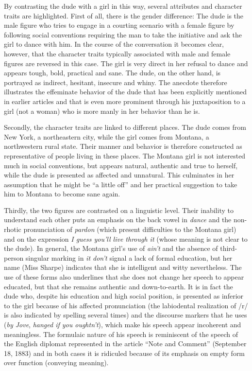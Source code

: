  By contrasting the dude with a girl in this way, several attributes and character traits are highlighted. First of all, there is the gender difference: The dude is the male figure who tries to engage in a courting scenario with a female figure by following social conventions requiring the man to take the initiative and ask the girl to dance with him. In the course of the conversation it becomes clear, however, that the character traits typically associated with male and female figures are reversed in this case. The girl is very direct in her refusal to dance and appears tough, bold, practical and sane. The dude, on the other hand, is portrayed as indirect, hesitant, insecure and whiny. The anecdote therefore illustrates the effeminate behavior of the dude that has been explicitly mentioned in earlier articles and that is even more prominent through his juxtaposition to a girl (not a woman) who is more manly in her behavior than he is.


Secondly, the character traits are linked to different places. The dude comes from New York, a northeastern city, while the girl comes from Montana, a northwestern rural state. Their manner and behavior is therefore constructed as representative of people living in these places. The Montana girl is not interested much in social conventions, but appears natural, authentic and true to herself, while the dude is presented as affected and unnatural. This culminates in her assumption that he might be “a little off” and her practical suggestion to take him to Montana to become sane again.

Thirdly, the two figures are contrasted on a linguistic level. Their inability to understand each other puts an emphasis on the back vowel in \emph{dance} and the non-rhotic pronunciation of \emph{pardon} (which present difficulties to the Montana girl) and on the expression \emph{I guess you’ll live through it} (whose meaning is not clear to the dude). In general, the Montana girl’s use of \emph{ain’t} and the absence of third-person singular marking in \emph{it don’t} signal a lack of formal education, but her name (Miss Sharpe) indicates that she is intelligent and witty nevertheless. The use of these forms also underlines that she does not change her speech to appear educated, but that she remains authentic and down-to-earth. It is in fact the dude who, despite his education and high social position, is presented as inferior to the girl because of his affected pronunciation (the labiodental realization of /r/ is also indicated by spelling several times) and the discourse markers that he uses (\emph{by Jove}, \emph{hanged if you oughtn’t}), which make his speech appear incoherent and meaningless. The formulaic nature of his speech is reminiscent of the speech of the English diplomat represented in the article “Note and Comment” (September 18, 1883) and in both cases it is ridiculed because of its emphasis on empty form over function (conveying meaning).

